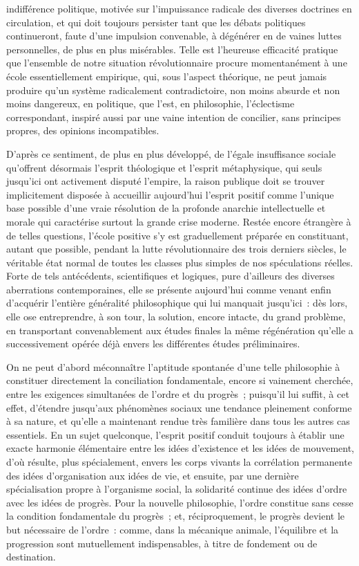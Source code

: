 \documentclass[french,twoside]{book} %
\begin{document}
indifférence politique, motivée sur l’impuissance radicale des diverses doctrines en circulation, et qui doit toujours persister tant que les débats politiques continueront, faute d’une impulsion convenable, à dégénérer en de vaines luttes personnelles, de plus en plus misérables. Telle est l’heureuse efficacité pratique que l’ensemble de notre situation révolutionnaire procure momentanément à une école essentiellement empirique, qui, sous l’aspect théorique, ne peut jamais produire qu’un système radicalement contradictoire, non moins absurde et non moins dangereux, en politique, que l’est, en philosophie, l’éclectisme correspondant, inspiré aussi par une vaine intention de concilier, sans principes propres, des opinions incompatibles.\par
D’après ce sentiment, de plus en plus développé, de l’égale insuffisance sociale qu’offrent désormais l’esprit théologique et l’esprit métaphysique, qui seuls jusqu’ici ont activement disputé l’empire, la raison publique doit se trouver implicitement disposée à accueillir aujourd’hui l’esprit positif comme l’unique base possible d’une vraie résolution de la profonde anarchie intellectuelle et morale qui caractérise surtout la grande crise moderne. Restée encore étrangère à de telles questions, l’école positive s’y est graduellement préparée en constituant, autant que possible, pendant la lutte révolutionnaire des trois derniers siècles, le véritable état normal de toutes les classes plus simples de nos spéculations réelles. Forte de tels antécédents, scientifiques et logiques, pure d’ailleurs des diverses aberrations contemporaines, elle se présente aujourd’hui comme venant enfin d’acquérir l’entière généralité philosophique qui lui manquait jusqu’ici : dès lors, elle ose entreprendre, à son tour, la solution, encore intacte, du grand problème, en transportant convenablement aux études finales la même régénération qu’elle a successivement opérée déjà envers les différentes études préliminaires.\par
On ne peut d’abord méconnaître l’aptitude spontanée d’une telle philosophie à constituer directement la conciliation fondamentale, encore si vainement cherchée, entre les exigences simultanées de l’ordre et du progrès ; puisqu’il lui suffit, à cet effet, d’étendre jusqu’aux phénomènes sociaux une tendance pleinement conforme à sa nature, et qu’elle a maintenant rendue très familière dans tous les autres cas essentiels. En un sujet quelconque, l’esprit positif conduit toujours à établir une exacte harmonie élémentaire entre les idées d’existence et les idées de mouvement, d’où résulte, plus spécialement, envers les corps vivants la corrélation permanente des idées d’organisation aux idées de vie, et ensuite, par une dernière spécialisation propre à l’organisme social, la solidarité continue des idées d’ordre avec les idées de progrès. Pour la nouvelle philosophie, l’ordre constitue sans cesse la condition fondamentale du progrès ; et, réciproquement, le progrès devient le but nécessaire de l’ordre : comme, dans la mécanique animale, l’équilibre et la progression sont mutuellement indispensables, à titre de fondement ou de destination.\par
\end{document}
